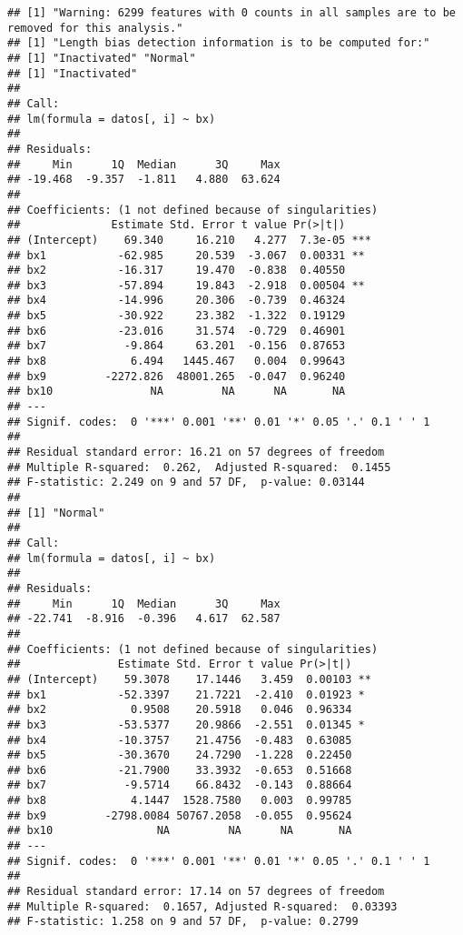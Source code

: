\documentclass[]{article}
\begin{document}
\begin{verbatim}
## [1] "Warning: 6299 features with 0 counts in all samples are to be removed for this analysis."
## [1] "Length bias detection information is to be computed for:"
## [1] "Inactivated" "Normal"     
## [1] "Inactivated"
## 
## Call:
## lm(formula = datos[, i] ~ bx)
## 
## Residuals:
##     Min      1Q  Median      3Q     Max 
## -19.468  -9.357  -1.811   4.880  63.624 
## 
## Coefficients: (1 not defined because of singularities)
##              Estimate Std. Error t value Pr(>|t|)    
## (Intercept)    69.340     16.210   4.277  7.3e-05 ***
## bx1           -62.985     20.539  -3.067  0.00331 ** 
## bx2           -16.317     19.470  -0.838  0.40550    
## bx3           -57.894     19.843  -2.918  0.00504 ** 
## bx4           -14.996     20.306  -0.739  0.46324    
## bx5           -30.922     23.382  -1.322  0.19129    
## bx6           -23.016     31.574  -0.729  0.46901    
## bx7            -9.864     63.201  -0.156  0.87653    
## bx8             6.494   1445.467   0.004  0.99643    
## bx9         -2272.826  48001.265  -0.047  0.96240    
## bx10               NA         NA      NA       NA    
## ---
## Signif. codes:  0 '***' 0.001 '**' 0.01 '*' 0.05 '.' 0.1 ' ' 1
## 
## Residual standard error: 16.21 on 57 degrees of freedom
## Multiple R-squared:  0.262,  Adjusted R-squared:  0.1455 
## F-statistic: 2.249 on 9 and 57 DF,  p-value: 0.03144
## 
## [1] "Normal"
## 
## Call:
## lm(formula = datos[, i] ~ bx)
## 
## Residuals:
##     Min      1Q  Median      3Q     Max 
## -22.741  -8.916  -0.396   4.617  62.587 
## 
## Coefficients: (1 not defined because of singularities)
##               Estimate Std. Error t value Pr(>|t|)   
## (Intercept)    59.3078    17.1446   3.459  0.00103 **
## bx1           -52.3397    21.7221  -2.410  0.01923 * 
## bx2             0.9508    20.5918   0.046  0.96334   
## bx3           -53.5377    20.9866  -2.551  0.01345 * 
## bx4           -10.3757    21.4756  -0.483  0.63085   
## bx5           -30.3670    24.7290  -1.228  0.22450   
## bx6           -21.7900    33.3932  -0.653  0.51668   
## bx7            -9.5714    66.8432  -0.143  0.88664   
## bx8             4.1447  1528.7580   0.003  0.99785   
## bx9         -2798.0084 50767.2058  -0.055  0.95624   
## bx10                NA         NA      NA       NA   
## ---
## Signif. codes:  0 '***' 0.001 '**' 0.01 '*' 0.05 '.' 0.1 ' ' 1
## 
## Residual standard error: 17.14 on 57 degrees of freedom
## Multiple R-squared:  0.1657, Adjusted R-squared:  0.03393 
## F-statistic: 1.258 on 9 and 57 DF,  p-value: 0.2799
\end{verbatim}
\end{document}
